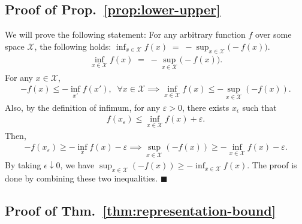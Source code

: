 \subsection*{Proof of Prop.~\ref{prop:lower-upper}}
We will prove the following statement: For any arbitrary function $f$ over some space $\mathcal{X}$, the following holds: $\inf_{x \in \mathcal{X}} f(x) \;=\; - \sup_{x \in \mathcal{X}} \big(-f(x)\big)$. 
\begin{align}
    \inf_{x \in \mathcal{X}} f(x) \;=\; - \sup_{x \in \mathcal{X}} \big(-f(x)\big).
\end{align}
For any $x \in \mathcal{X}$, 
    \begin{align}
        -f(x) \leq -\inf_{x'} f(x'), \;\; \forall x \in \mathcal{X} \implies \inf_{x \in \mathcal{X}} f(x)  \leq -\sup_{x \in \mathcal{X}}(-f(x)). 
    \end{align}
    Also, by the definition of infimum, for any $\varepsilon > 0$, there exists $x_{\epsilon}$ such that 
    \begin{align}
        f(x_\varepsilon) \le \inf_{x \in \mathcal{X}} f(x) + \varepsilon.
    \end{align}
    Then, 
    \begin{align}
        -f(x_\varepsilon) \ge -\inf_x f(x) - \varepsilon \implies \sup_{x \in \mathcal{X}} (-f(x)) \ge -\inf_{x \in \mathcal{X}} f(x) - \varepsilon.
    \end{align}
    By taking $\epsilon \downarrow 0$, we have $\sup_{x \in \mathcal{X}} (-f(x)) \ge -\inf_{x\in\mathcal{X}} f(x)$. The proof is done by combining these two inequalities.  \hfill $\blacksquare$


\subsection*{Proof of Thm.~\ref{thm:representation-bound}}

